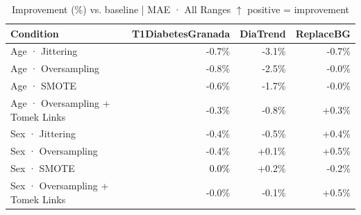 \begin{table}[htbp]
\centering
\small
\caption{Improvement (\%) vs. baseline  |  MAE · All Ranges  $\uparrow$ positive = improvement}
\label{tab:delta_mae_entire_family_size_oversampling}
\begin{tabular}{lrrr}
\toprule
\textbf{Condition} & \textbf{T1DiabetesGranada} & \textbf{DiaTrend} & \textbf{ReplaceBG} \\
\midrule
Age · Jittering & \textcolor{BrickRed}{-0.7\%} & \textcolor{BrickRed}{-3.1\%} & \textcolor{BrickRed}{-0.7\%} \\
Age · Oversampling & \textcolor{BrickRed}{-0.8\%} & \textcolor{BrickRed}{-2.5\%} & \textcolor{BrickRed}{-0.0\%} \\
Age · SMOTE & \textcolor{BrickRed}{-0.6\%} & \textcolor{BrickRed}{-1.7\%} & \textcolor{BrickRed}{-0.0\%} \\
Age · Oversampling + Tomek Links & \textcolor{BrickRed}{-0.3\%} & \textcolor{BrickRed}{-0.8\%} & \textcolor{OliveGreen}{+0.3\%} \\
\midrule
Sex · Jittering & \textcolor{BrickRed}{-0.4\%} & \textcolor{BrickRed}{-0.5\%} & \textcolor{OliveGreen}{+0.4\%} \\
Sex · Oversampling & \textcolor{BrickRed}{-0.4\%} & \textcolor{OliveGreen}{+0.1\%} & \textcolor{OliveGreen}{+0.5\%} \\
Sex · SMOTE & \textcolor{black}{0.0\%} & \textcolor{OliveGreen}{+0.2\%} & \textcolor{BrickRed}{-0.2\%} \\
Sex · Oversampling + Tomek Links & \textcolor{BrickRed}{-0.0\%} & \textcolor{BrickRed}{-0.1\%} & \textcolor{OliveGreen}{+0.5\%} \\
\bottomrule
\end{tabular}
\end{table}